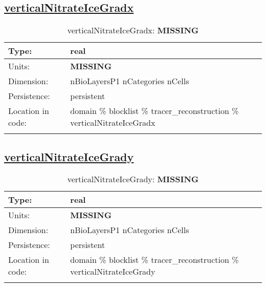 \subsection[verticalNitrateIceGradx]{\hyperref[sec:var_tab_tracer_reconstruction]{verticalNitrateIceGradx}}
\label{subsec:var_sec_tracer_reconstruction_verticalNitrateIceGradx}
\begin{center}
\begin{longtable}{| p{2.0in} | p{4.0in} |}
        \hline 
        Type: & real \\
        \hline 
        Units: & {\bf \color{red} MISSING} \\
        \hline 
        Dimension: & nBioLayersP1 nCategories nCells \\
        \hline 
        Persistence: & persistent \\
        \hline 
         Location in code: & domain \% blocklist \% tracer\_reconstruction \% verticalNitrateIceGradx \\
         \hline 
    \caption{verticalNitrateIceGradx: {\bf \color{red} MISSING}}
\end{longtable}
\end{center}
\subsection[verticalNitrateIceGrady]{\hyperref[sec:var_tab_tracer_reconstruction]{verticalNitrateIceGrady}}
\label{subsec:var_sec_tracer_reconstruction_verticalNitrateIceGrady}
\begin{center}
\begin{longtable}{| p{2.0in} | p{4.0in} |}
        \hline 
        Type: & real \\
        \hline 
        Units: & {\bf \color{red} MISSING} \\
        \hline 
        Dimension: & nBioLayersP1 nCategories nCells \\
        \hline 
        Persistence: & persistent \\
        \hline 
         Location in code: & domain \% blocklist \% tracer\_reconstruction \% verticalNitrateIceGrady \\
         \hline 
    \caption{verticalNitrateIceGrady: {\bf \color{red} MISSING}}
\end{longtable}
\end{center}
